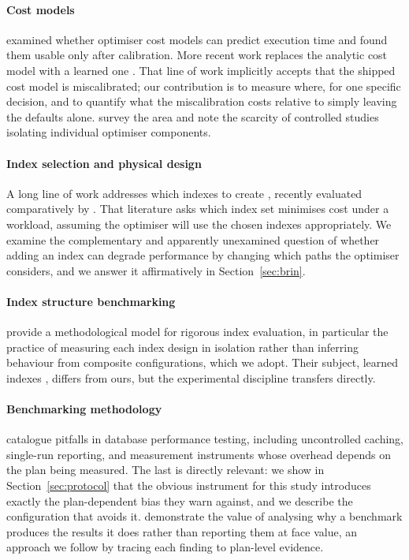 \documentclass[preprint,12pt,authoryear]{elsarticle}
\begin{document}
\paragraph{Cost models}
\citet{wu2013predicting} examined whether optimiser cost models can
predict execution time and found them usable only after calibration.
More recent work replaces the analytic cost model with a learned one
\citep{marcus2019neo,marcus2021bao}. That line of work implicitly
accepts that the shipped cost model is miscalibrated; our contribution
is to measure where, for one specific decision, and to quantify what
the miscalibration costs relative to simply leaving the defaults alone.
\citet{lan2021survey} survey the area and note the scarcity of
controlled studies isolating individual optimiser components.

\paragraph{Index selection and physical design}
A long line of work addresses which indexes to create
\citep{chaudhuri1997efficient}, recently evaluated comparatively by
\citet{kossmann2020magic}. That literature asks which index set
minimises cost under a workload, assuming the optimiser will use the
chosen indexes appropriately. We examine the complementary and
apparently unexamined question of whether adding an index can degrade
performance by changing which paths the optimiser considers, and we
answer it affirmatively in Section~\ref{sec:brin}.

\paragraph{Index structure benchmarking}
\citet{wongkham2022updatable} provide a methodological model for
rigorous index evaluation, in particular the practice of measuring each
index design in isolation rather than inferring behaviour from
composite configurations, which we adopt. Their subject, learned
indexes \citep{kraska2018case}, differs from ours, but the
experimental discipline transfers directly.

\paragraph{Benchmarking methodology}
\citet{raasveldt2018fair} catalogue pitfalls in database performance
testing, including uncontrolled caching, single-run reporting, and
measurement instruments whose overhead depends on the plan being
measured. The last is directly relevant: we show in
Section~\ref{sec:protocol} that the obvious instrument for this study
introduces exactly the plan-dependent bias they warn against, and we
describe the configuration that avoids it. \citet{boncz2013tpch}
demonstrate the value of analysing why a benchmark produces the results
it does rather than reporting them at face value, an approach we follow
by tracing each finding to plan-level evidence.
\end{document}
